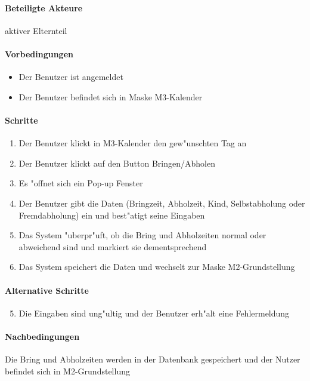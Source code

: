   \paragraph{Beteiligte Akteure}   \leavevmode \newline
    aktiver Elternteil
  \paragraph{Vorbedingungen}
  \begin{itemize}
   \item Der Benutzer ist angemeldet
   \item Der Benutzer befindet sich in Maske M3-Kalender
  \end{itemize}

  \paragraph{Schritte}
  \begin{enumerate}
   \item Der Benutzer klickt in M3-Kalender den gew"unschten Tag an
   \item Der Benutzer klickt auf den Button \dq Bringen/Abholen\dq
   \item Es "offnet sich ein Pop-up Fenster
   \item Der Benutzer gibt die Daten (Bringzeit, Abholzeit, Kind, Selbstabholung oder Fremdabholung) ein und best"atigt seine Eingaben
   \item Das System "uberpr"uft, ob die Bring und Abholzeiten normal oder abweichend sind und markiert sie dementsprechend
   \item Das System speichert die Daten und wechselt zur Maske M2-Grundstellung
  \end{enumerate}

  \paragraph{Alternative Schritte}
  \begin{enumerate}
  \setcounter{enumi}{4}
   \item  Die Eingaben sind ung"ultig und der Benutzer erh"alt eine Fehlermeldung
  \end{enumerate}

  \paragraph{Nachbedingungen}
  Die Bring und Abholzeiten werden in der Datenbank gespeichert und der Nutzer befindet sich in M2-Grundstellung

